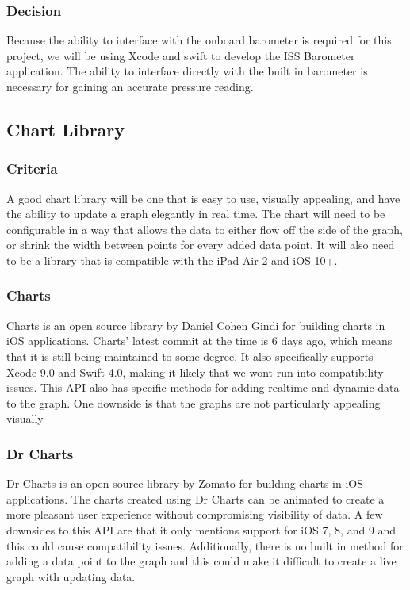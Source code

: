 \documentclass[onecolumn, draftclsnofoot,10pt, compsoc]{IEEEtran}
\begin{document}
\subsubsection{Decision}
Because the ability to interface with the onboard barometer is required for this project, we will be using Xcode and swift to develop the ISS Barometer application.
The ability to interface directly with the built in barometer is necessary for gaining an accurate pressure reading.

\subsection{Chart Library}
\subsubsection{Criteria}
A good chart library will be one that is easy to use, visually appealing, and have the ability to update a graph elegantly in real time.
The chart will need to be configurable in a way that allows the data to either flow off the side of the graph, or shrink the width between points for every added data point.
It will also need to be a library that is compatible with the iPad Air 2 and iOS 10+.

\subsubsection{Charts}
Charts is an open source library by Daniel Cohen Gindi for building charts in iOS applications.
Charts' latest commit at the time is 6 days ago, which means that it is still being maintained to some degree.
It also specifically supports Xcode 9.0 and Swift 4.0, making it likely that we wont run into compatibility issues.
This API also has specific methods for adding realtime and dynamic data to the graph.
One downside is that the graphs are not particularly appealing visually

\subsubsection{Dr Charts}
Dr Charts is an open source library by Zomato for building charts in iOS applications.
The charts created using Dr Charts can be animated to create a more pleasant user experience without compromising visibility of data.
A few downsides to this API are that it only mentions support for iOS 7, 8, and 9 and this could cause compatibility issues.
Additionally, there is no built in method for adding a data point to the graph and this could make it difficult to create a live graph with updating data.
\end{document}
